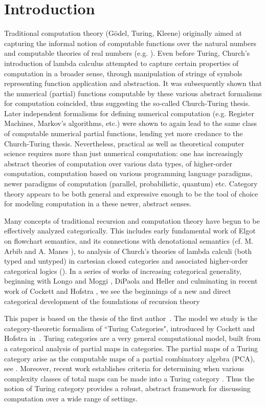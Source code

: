 \documentclass{entcs} \usepackage{entcsmacro}
\begin{document}
\section{Introduction}\label{intro}

Traditional computation theory (G\"odel, Turing, Kleene) originally aimed at capturing the 
informal notion of computable functions over the natural numbers and computable theories of real numbers
(e.g. \cite{Turing-Paper,IMM}).  Even before Turing, Church's introduction of lambda calculus \cite{Church}  attempted to capture certain properties of computation in a broader sense,
through manipulation of strings of symbols representing function application and abstraction. It was subsequently shown that the
numerical (partial) functions computable by these various abstract formalisms for computation coincided, thus suggesting the so-called Church-Turing thesis.  Later independent formalisms
for defining numerical computation (e.g. Register Machines, Markov's algorithms, etc.) were shown to again lead to the same class of computable numerical partial functions, lending yet more credance to the Church-Turing thesis.  Nevertheless, practical as well as theoretical computer science requires more than just numerical computation:  one has increasingly abstract theories of computation over various data types, of higher-order computation, computation based on various programming language paradigms, newer paradigms of computation (parallel, probabilistic, quantum) etc.  Category theory appears to be both general and expressive enough to be 
the tool of choice for modeling computation in a these newer, abstract senses. 

Many concepts of traditional recursion and computation theory have begun to be effectively analyzed categorically.  This includes early fundamental work of Elgot on flowchart semantics,
and its connections with denotational semantics  (cf.  M. Arbib and A. Manes \cite{MA}), to 
analysis of Church's theories of lambda calculi (both typed and untyped) in cartesian closed categories and associated higher-order categorical logics (\cite{HOCL}).  In a series of works
of increasing categorical generality, beginning with Longo and Moggi \cite{LMog}, DiPaola and Heller \cite{DiPao} and culminating in recent work of Cockett and Hofstra \cite{Turing}, we see the beginnings of a new and direct categorical development of the foundations of recursion theory 


This paper is based on the thesis of the first author~\cite{MyPhD}.
The model we study is the category-theoretic formalism of ``Turing Categories", introduced by Cockett and Hofstra in~\cite{Turing}. Turing categories are a very general computational model, built from a categorical analysis of 
partial maps in categories. The partial maps of a Turing category arise as the computable maps of a partial combinatory algebra (PCA), see \cite{Turing}.  Moreover,  recent work establishes criteria for 
determining when various complexity classes of total maps  can be made into a Turing category
\cite{Total}.  Thus the notion of Turing category provides a robust, abstract framework for discussing computation over a wide range of settings. 
\end{document}
